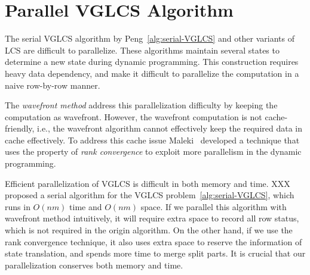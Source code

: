 \section{Parallel VGLCS Algorithm} %
\label{sec:parallelSerial}

The serial VGLCS algorithm by Peng~\ref{alg:serial-VGLCS} and other
variants of LCS are difficult to parallelize.  These algorithms
maintain several states to determine a new state during dynamic
programming.  This construction requires heavy data dependency, and
make it difficult to parallelize the computation in a naive row-by-row
manner.

The {\em wavefront method} address this parallelization difficulty by
keeping the computation as wavefront.  However, the wavefront
computation is not cache-friendly, i.e., the wavefront algorithm
cannot effectively keep the required data in cache effectively.  To
address this cache issue Maleki~\cite{Maleki2016EfficientPU} developed
a technique that uses the property of {\em rank convergence} to
exploit more parallelism in the dynamic programming.  %

\iffalse
在 $O(nm \alpha(n))$ 的序列算法 \ref{alg:serial-VGLCS} 中，
我們發現算法如大多數的變型 LCS 相同，依賴數個狀態以轉移當前狀態，
大量的資料依賴性不易於細粒度平行。使用波前運行平行是一種常見的解決方案，
由於這種平行對於運行時的快取不友善 (cache-unfriendly)，
在 Saeed Maleki ~\cite{saeed} 論文中提到如何使用 Rank Convergence 的特殊性質，
拓展出更高平行度來解決動態規劃的相關問題。
\fi




Efficient parallelization of VGLCS is difficult in both memory and
time.  XXX proposed a serial algorithm for the VGLCS
problem~\ref{alg:serial-VGLCS}, which runs in $O(nm)$ time and $O(nm)$
space.  If we parallel this algorithm with wavefront method
intuitively, it will require extra space to record all row status,
which is not required in the origin algorithm.  On the other hand, if
we use the rank convergence technique, it also uses extra space to
reserve the information of state translation, and spends more time to
merge split parts.  It is crucial that our parallelization conserves
both memory and time.

\iffalse 序列算法的空間複雜度為 $O(nm)$。若使用波前平行，需要同時維護橫
向的所有狀態，需要多付出一倍的空間量。若加入 Rank Convergence 的想法拓
展出，勢必要記錄轉移的狀態，需要耗費更多的記憶體空間，用以在最後階段合
併所用。\fi

